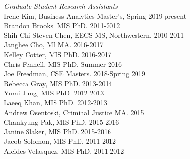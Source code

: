 \documentclass[9pt]{extarticle}
\begin{document}
\emph{Graduate Student Research Assistants} \\
\vspace{1pt}
Irene Kim, Business Analytics Master's, Spring 2019-present \\
Brandon Brooks, MIS PhD. 2011-2012 \\
Shih-Chi Steven Chen, EECS MS, Northwestern. 2010-2011 \\
Janghee Cho, MI MA. 2016-2017 \\
Kelley Cotter, MIS PhD. 2016-2017 \\
Chris Fennell, MIS PhD. Summer 2016 \\
Joe Freedman, CSE Masters. 2018-Spring 2019 \\
Rebecca Gray, MIS PhD. 2013-2014 \\
Yumi Jung, MIS PhD. 2012-2013 \\
Laeeq Khan, MIS PhD. 2012-2013 \\
Andrew Osentoski, Criminal Justice MA. 2015 \\
Chankyung Pak, MIS PhD. 2015-2016 \\
Janine Slaker, MIS PhD. 2015-2016 \\
Jacob Solomon, MIS PhD. 2011-2012 \\
Alcides Velasquez, MIS PhD. 2011-2012

\end{document}
